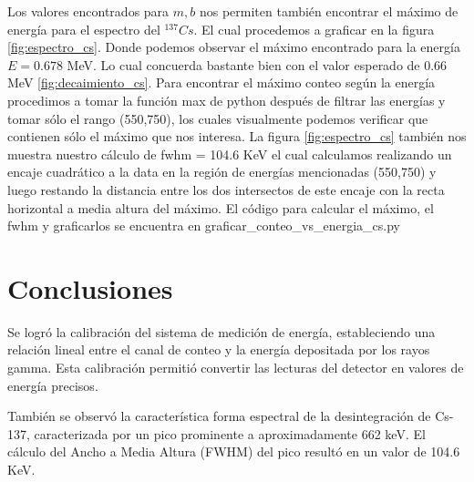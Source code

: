 \documentclass[twocolumn,a4paper,11pt]{scrartcl}
\begin{document}
Los valores encontrados para $m, b$ nos permiten también encontrar el máximo de energía para el espectro del $^{137}Cs$. El cual procedemos a graficar en la figura \ref{fig:espectro_cs}. Donde podemos observar el máximo encontrado para la energía $E= 0.678$ MeV. Lo cual concuerda bastante bien con el valor esperado de 0.66 MeV \ref{fig:decaimiento_cs}.
Para encontrar el máximo conteo según la energía procedimos a tomar la función max de python después de filtrar las energías y tomar sólo el rango (550,750), los cuales visualmente podemos verificar que contienen sólo el máximo que nos interesa.
La figura \ref{fig:espectro_cs} también nos muestra nuestro cálculo de fwhm = 104.6 KeV \cite{Martin2010} el cual calculamos realizando un encaje cuadrático a la data en la región de energías mencionadas (550,750) y luego restando la distancia entre los dos intersectos de este encaje con la recta horizontal a media altura del máximo. El código para calcular el máximo, el fwhm y graficarlos se encuentra en graficar\_conteo\_vs\_energia\_cs.py

\section{Conclusiones}

Se logró la calibración del sistema de medición de energía, estableciendo una relación lineal entre el canal de conteo y la energía depositada por los rayos gamma. Esta calibración permitió convertir las lecturas del detector en valores de energía precisos.

También se observó la característica forma espectral de la desintegración de Cs-137, caracterizada por un pico prominente a aproximadamente 662 keV.  El cálculo del Ancho a Media Altura (FWHM) del pico resultó en un valor de 104.6 KeV.


 
\end{document}
